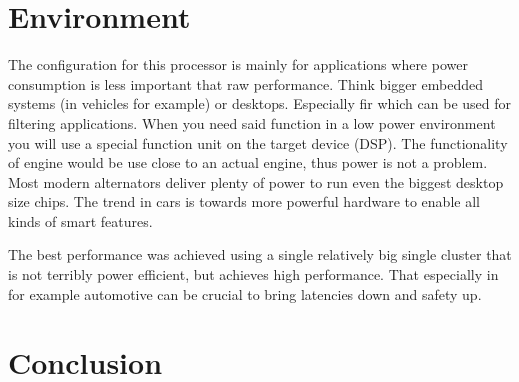 \section{Environment}
The configuration for this processor is mainly for applications where power consumption is less important that raw performance.
Think bigger embedded systems (in vehicles for example) or desktops.
Especially fir which can be used for filtering applications.
When you need said function in a low power environment you will use a special function unit on the target device (DSP).
The functionality of engine would be use close to an actual engine, thus power is not a problem.
Most modern alternators deliver plenty of power to run even the biggest desktop size chips.
The trend in cars is towards more powerful hardware to enable all kinds of smart features.

The best performance was achieved using a single relatively big single cluster that is not terribly power efficient, but achieves high performance.
That especially in for example automotive can be crucial to bring latencies down and safety up.

\section{Conclusion}
